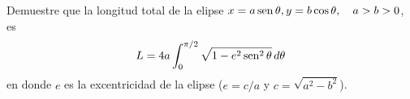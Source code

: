 \item Demuestre que la longitud total de la elipse $x = a \operatorname{sen} \theta, y = b \cos \theta, \quad a > b > 0$, es
    \[ L = 4a \int_0^{\pi/2} \sqrt{1 - e^2 \operatorname{sen}^2 \theta} \, d\theta \]
    en donde $e$ es la excentricidad de la elipse ($e = c/a$ y $c = \sqrt{a^2 - b^2}$).
